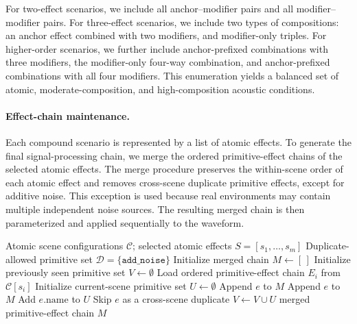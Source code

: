 \documentclass{llmxive}
\begin{document}
For two-effect scenarios, we include all anchor--modifier pairs and all
modifier--modifier pairs. For three-effect scenarios, we include two types of
compositions: an anchor effect combined with two modifiers, and modifier-only
triples. For higher-order scenarios, we further include anchor-prefixed
combinations with three modifiers, the modifier-only four-way combination, and
anchor-prefixed combinations with all four modifiers. This enumeration yields a
balanced set of atomic, moderate-composition, and high-composition acoustic
conditions.

\paragraph{Effect-chain maintenance.}
Each compound scenario is represented by a list of atomic effects. To generate
the final signal-processing chain, we merge the ordered primitive-effect chains
of the selected atomic effects. The merge procedure preserves the within-scene
order of each atomic effect and removes cross-scene duplicate primitive effects,
except for additive noise. This exception is used because real environments may
contain multiple independent noise sources. The resulting merged chain is then
parameterized and applied sequentially to the waveform.

\begin{algorithm}[t]
\caption{Effect-chain maintenance for compound acoustic scenarios}
\label{alg:effect_chain_maintenance}
\begin{algorithmic}[1]
\Require Atomic scene configurations $\mathcal{C}$; selected atomic effects $S=[s_1,\ldots,s_m]$
\Require Duplicate-allowed primitive set $\mathcal{D}=\{\texttt{add\_noise}\}$
\State Initialize merged chain $M \leftarrow [\,]$
\State Initialize previously seen primitive set $V \leftarrow \emptyset$
    \State Load ordered primitive-effect chain $E_i$ from $\mathcal{C}[s_i]$
    \State Initialize current-scene primitive set $U \leftarrow \emptyset$
            \State Append $e$ to $M$
            \State Append $e$ to $M$
            \State Add $e.\mathrm{name}$ to $U$
        \Else
            \State Skip $e$ as a cross-scene duplicate
        \EndIf
    \EndFor
    \State $V \leftarrow V \cup U$
\EndFor
\State \Return merged primitive-effect chain $M$
\end{algorithmic}
\end{algorithm}
\end{document}
